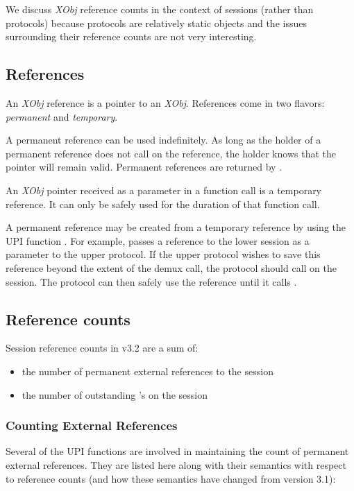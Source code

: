 We discuss {\em XObj} reference counts in the context of
sessions (rather than protocols) because protocols are relatively
static objects and the issues surrounding their reference counts are
not very interesting.


\subsection{References}

An {\em XObj} reference is a pointer to an {\em XObj}.  References come in
two flavors: {\sl permanent} and {\sl temporary}.  

A permanent reference can be used indefinitely.  As long as the holder
of a permanent reference does not call \xClose{} on the reference, the
holder knows that the pointer will remain valid.  Permanent references
are returned by \xOpen{}.

An {\em XObj} pointer received as a parameter in a function call is a
temporary reference.  It can only be safely used for the duration of
that function call.

A permanent reference may be created from a temporary reference by
using the UPI function \xDuplicate{}.  For example, \xDemux{} passes a
reference to the lower session as a parameter to the upper protocol.
If the upper protocol wishes to save this reference beyond the extent
of the demux call, the protocol should call \xDuplicate{} on the
session.  The protocol can then safely use the reference until it
calls \xClose{}.


\subsection{Reference counts}

Session reference counts in v3.2 are a sum of:
\begin{itemize}
\begin{itemize}
\item{}
the number of permanent external references to the session
\item{}
the number of outstanding \xPop{}'s on the session
\end{itemize}
\end{itemize}

\subsubsection{ Counting External References }

Several of the UPI functions are involved in maintaining the count of
permanent external references.  They are listed here along with their
semantics with respect to reference counts (and how these semantics
have changed from \xk{} version 3.1):

